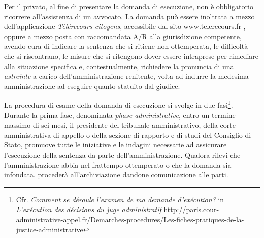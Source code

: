 \documentclass[12pt,it,a4paper,]{report}
\begin{document}
Per il privato, al fine di presentare la domanda di esecuzione, non è
obbligatorio ricorrere all'assistenza di un avvocato. La domanda può
essere inoltrata a mezzo dell'applicazione \emph{Télérecours citoyens},
accessibile dal sito www.telerecours.fr , oppure a mezzo posta con
raccomandata A/R alla giurisdizione competente, avendo cura di indicare
la sentenza che si ritiene non ottemperata, le difficoltà che si
riscontrano, le misure che si ritengono dover essere intraprese per
rimediare alla situazione specifica e, contestualmente, richiedere la
pronuncia di una \emph{astreinte} a carico dell'amministrazione
renitente, volta ad indurre la medesima amministrazione ad eseguire
quanto statuito dal giudice.

La procedura di esame della domanda di esecuzione si svolge in due
fasi\footnote{Cfr. \emph{Comment se déroule l'examen de ma demande
  d'exécution?} in \emph{L'exécution des décisions du juge
  administratif}
  http://paris.cour-administrative-appel.fr/Demarches-procedures/Les-fiches-pratiques-de-la-justice-administrative}.
Durante la prima fase, denominata \emph{phase administrative}, entro un
termine massimo di sei mesi, il presidente del tribunale amministrativo,
della corte amministrativa di appello o della sezione di rapporto e di
studi del Consiglio di Stato, promuove tutte le iniziative e le indagini
necessarie ad assicurare l'esecuzione della sentenza da parte
dell'amministrazione. Qualora rilevi che l'amministrazione abbia nel
frattempo ottemperato o che la domanda sia infondata, procederà
all'archiviazione dandone comunicazione alle parti.
\end{document}
